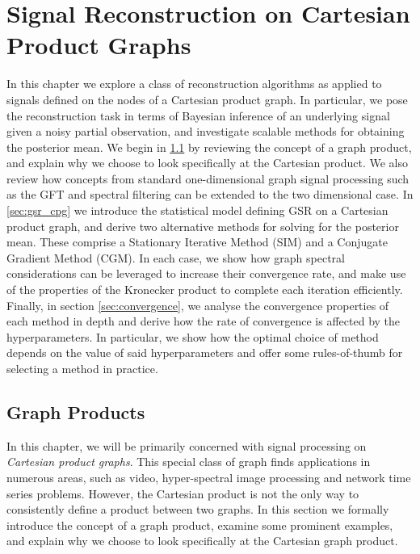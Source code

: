 \chapter{Signal Reconstruction on Cartesian Product Graphs}

\label{chap:gsr_2d}



In this chapter we explore a class of reconstruction algorithms as applied to signals defined on the nodes of a Cartesian product graph. In particular, we pose the reconstruction task in terms of Bayesian inference of an underlying signal given a noisy partial observation, and investigate scalable methods for obtaining the posterior mean. We begin in \cref{sec:reg_and_rec_intro} by reviewing the concept of a graph product, and explain why we choose to look specifically at the Cartesian product. We also review how concepts from standard one-dimensional graph signal processing such as the GFT and spectral filtering can be extended to the two dimensional case. In \cref{sec:gsr_cpg} we introduce the statistical model defining GSR on a Cartesian product graph, and derive two alternative methods for solving for the posterior mean. These comprise a Stationary Iterative Method (SIM) and a Conjugate Gradient Method (CGM). In each case, we show how graph spectral considerations can be leveraged to increase their convergence rate, and make use of the properties of the Kronecker product to complete each iteration efficiently. Finally, in section \ref{sec:convergence}, we analyse the convergence properties of each method in depth and derive how the rate of convergence is affected by the hyperparameters. In particular, we show how the optimal choice of method depends on the value of said hyperparameters and offer some rules-of-thumb for selecting a method in practice. 




\section{Graph Products}

\label{sec:reg_and_rec_intro}

In this chapter, we will be primarily concerned with signal processing on \textit{Cartesian product graphs}. This special class of graph finds applications in numerous areas, such as video, hyper-spectral image processing and network time series problems. However, the Cartesian product is not the only way to consistently define a product between two graphs. In this section we formally introduce the concept of a graph product, examine  some prominent examples, and explain why we choose to look specifically at the Cartesian graph product.

